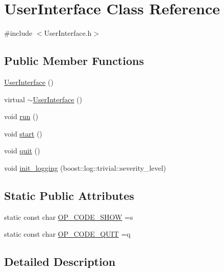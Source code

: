 \hypertarget{class_user_interface}{}\section{User\+Interface Class Reference}
\label{class_user_interface}


{\ttfamily \#include $<$User\+Interface.\+h$>$}

\subsection*{Public Member Functions}
\begin{DoxyCompactItemize}
\item 
\hyperlink{class_user_interface_ae6fb70370701b3bd6120e923df9705b0}{User\+Interface} ()
\item 
virtual \hyperlink{class_user_interface_ae588b2ff1711a016dd4c6fc5002c0841}{$\sim$\+User\+Interface} ()
\item 
void \hyperlink{class_user_interface_a6d8d6d6b6900823be51259efba78b400}{run} ()
\item 
void \hyperlink{class_user_interface_a79350878c72585ae34e4321613ed2c1a}{start} ()
\item 
void \hyperlink{class_user_interface_aed9ff11dad1ecd1611498771b63bc47d}{quit} ()
\item 
void \hyperlink{class_user_interface_a66e0842cd0c15c03162bdbb4b1a8583b}{init\+\_\+logging} (boost\+::log\+::trivial\+::severity\+\_\+level)
\end{DoxyCompactItemize}
\subsection*{Static Public Attributes}
\begin{DoxyCompactItemize}
\item 
static const char \hyperlink{class_user_interface_ae4736080db86b9df78359826bd993cc5}{O\+P\+\_\+\+C\+O\+D\+E\+\_\+\+S\+H\+OW} =\textquotesingle{}s\textquotesingle{}
\item 
static const char \hyperlink{class_user_interface_a20eef406b46e1b32db660b50cf30e796}{O\+P\+\_\+\+C\+O\+D\+E\+\_\+\+Q\+U\+IT} =\textquotesingle{}q\textquotesingle{}
\end{DoxyCompactItemize}


\subsection{Detailed Description}


